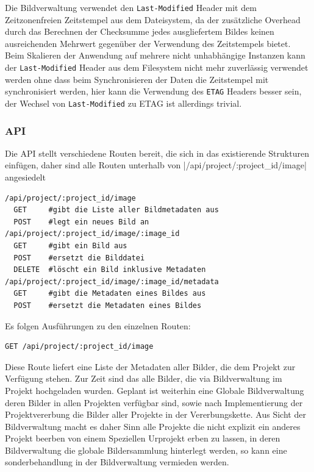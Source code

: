 Die Bildverwaltung verwendet den \texttt{Last-Modified} Header mit dem
Zeitzonenfreien Zeitstempel aus dem Dateisystem, da der zusätzliche Overhead
durch das Berechnen der Checksumme jedes ausgliefertem Bildes keinen
ausreichenden Mehrwert gegenüber der Verwendung des Zeitstempels bietet. Beim
Skalieren der Anwendung auf mehrere nicht unhabhängige Instanzen kann der
\texttt{Last-Modified} Header aus dem Filesystem nicht mehr zuverlässig
verwendet werden ohne dass beim Synchronisieren der Daten die Zeitstempel mit
synchronisiert werden, hier kann die Verwendung des \texttt{ETAG} Headers besser
sein, der Wechsel von \texttt{Last-Modified} zu ETAG ist allerdings trivial.

\subsubsection{API}

Die API stellt verschiedene Routen bereit, die sich in das existierende
Strukturen einfügen, daher sind alle Routen unterhalb von
|/api/project/:project_id/image| angesiedelt

\begin{verbatim}
/api/project/:project_id/image
  GET     #gibt die Liste aller Bildmetadaten aus
  POST    #legt ein neues Bild an
/api/project/:project_id/image/:image_id
  GET     #gibt ein Bild aus
  POST    #ersetzt die Bilddatei
  DELETE  #löscht ein Bild inklusive Metadaten
/api/project/:project_id/image/:image_id/metadata
  GET     #gibt die Metadaten eines Bildes aus
  POST    #ersetzt die Metadaten eines Bildes
\end{verbatim}

Es folgen Ausführungen zu den einzelnen Routen:

\begin{verbatim}
GET /api/project/:project_id/image
\end{verbatim}

Diese Route liefert eine Liste der Metadaten aller Bilder, die dem Projekt zur
Verfügung stehen. Zur Zeit sind das alle Bilder, die via Bildverwaltung im
Projekt hochgeladen wurden. Geplant ist weiterhin eine Globale Bildverwaltung
deren Bilder in allen Projekten verfügbar sind, sowie nach Implementierung der
Projektvererbung die Bilder aller Projekte in der Vererbungskette. Aus Sicht der
Bildverwaltung macht es daher Sinn alle Projekte die nicht explizit ein anderes
Projekt beerben von einem Speziellen Urprojekt erben zu lassen, in deren
Bildverwaltung die globale Bildersammlung hinterlegt werden, so kann eine
sonderbehandlung in der Bildverwaltung vermieden werden.

